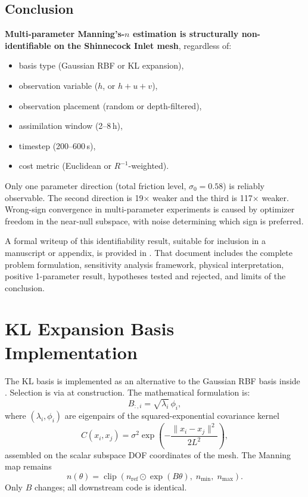 \documentclass[11pt]{article}
\begin{document}
\subsection{Conclusion}
\textbf{Multi-parameter Manning's-$n$ estimation is structurally non-identifiable on the Shinnecock Inlet mesh}, regardless of:
\begin{itemize}
\item basis type (Gaussian RBF or KL expansion),
\item observation variable ($h$, or $h{+}u{+}v$),
\item observation placement (random or depth-filtered),
\item assimilation window (2--8\,h),
\item timestep (200--600\,s),
\item cost metric (Euclidean or $R^{-1}$-weighted).
\end{itemize}
Only one parameter direction (total friction level, $\sigma_0 = 0.58$) is reliably observable. The second direction is 19$\times$ weaker and the third is 117$\times$ weaker. Wrong-sign convergence in multi-parameter experiments is caused by optimizer freedom in the near-null subspace, with noise determining which sign is preferred.

A formal writeup of this identifiability result, suitable for inclusion in a manuscript or appendix, is provided in . That document includes the complete problem formulation, sensitivity analysis framework, physical interpretation, positive 1-parameter result, hypotheses tested and rejected, and limits of the conclusion.

\section{KL Expansion Basis Implementation}
\label{sec:kl-implementation}
The KL basis is implemented as an alternative to the Gaussian RBF basis inside . Selection is via  at construction. The mathematical formulation is:
\[
B_{:,i} = \sqrt{\lambda_i}\, \phi_i,
\]
where $(\lambda_i, \phi_i)$ are eigenpairs of the squared-exponential covariance kernel
\[
C(x_i, x_j) = \sigma^2 \exp\!\left(-\frac{\|x_i - x_j\|^2}{2L^2}\right),
\]
assembled on the scalar subspace DOF coordinates of the mesh. The Manning map remains
\[
n(\theta) = \operatorname{clip}\!\left(n_{\mathrm{ref}} \odot \exp(B\theta),\; n_{\min},\; n_{\max}\right).
\]
Only $B$ changes; all downstream code is identical.
\end{document}
